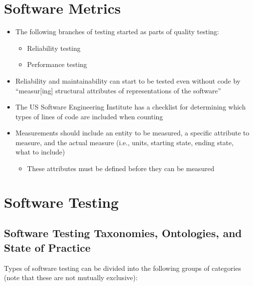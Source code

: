 \section{Software Metrics}
\label{chap:notes:sec:software-metrics}

\begin{itemize}
      \item The following branches of testing started as parts of quality
            testing:
            \begin{itemize}
                  \item Reliability testing \cite[p.~18, ch.~10]{fenton_software_1997}
                  \item Performance testing \cite[p.~18, ch.~7]{fenton_software_1997}
            \end{itemize}
      \item Reliability and maintainability can start to be tested even without
            code by ``measur[ing] structural attributes of representations of the
            software'' \cite[p.~18]{fenton_software_1997}
      \item The US Software Engineering Institute has a checklist for determining
            which types of lines of code are included when counting
            \cite[pp.~30-31]{fenton_software_1997}
      \item Measurements should include an entity to be measured, a specific
            attribute to measure, and the actual measure (i.e., units, starting
            state, ending state, what to include) \cite[p.~36]{fenton_software_1997}
            \begin{itemize}
                  \item These attributes must be defined before they can be
                        measured \cite[p.~38]{fenton_software_1997}
            \end{itemize}
\end{itemize}

\section{Software Testing}
\label{chap:notes:sec:software-testing}

\subsection{Software Testing Taxonomies, Ontologies, and State of Practice}

Types of software testing can be divided into the following groups of
categories (note that these are not mutually exclusive):

